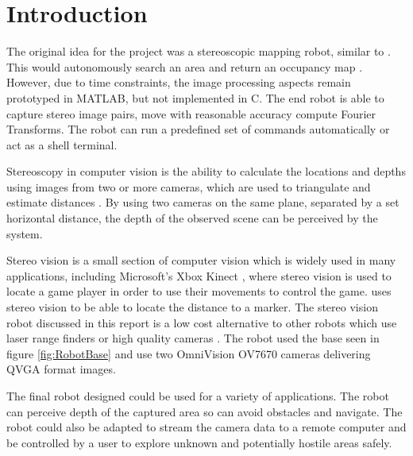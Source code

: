 \chapter{Introduction} \label{Chapter:Introduction}

%
%
%
%


The original idea for the project was a stereoscopic mapping robot, similar to \cite{Pirobot}. This would autonomously search an area and return an occupancy map \citep{thrun2003learning}. However, due to time constraints, the image processing aspects remain prototyped in MATLAB, but not implemented in C. The end robot is able to capture stereo image pairs, move with reasonable accuracy compute Fourier Transforms. The robot can run a predefined set of commands automatically or act as a shell terminal.

Stereoscopy in computer vision is the ability to calculate the locations and depths using images from two or more cameras, which are used to triangulate and estimate distances \citep{Saxena:DepthEstimation}. By using two cameras on the same plane, separated by a set horizontal distance, the depth of the observed scene can be perceived by the system.

Stereo vision is a small section of computer vision which is widely used in many applications, including Microsoft's Xbox Kinect \citep{Microsoft:Kinect}, where stereo vision is used to locate a game player in order to use their movements to control the game. \cite{Mrovlje:Distance_Stereoscopic} uses stereo vision to be able to locate the distance to a marker. 
The stereo vision robot discussed in this report is a low cost alternative to other robots which use laser range finders or high quality cameras \citep{Se:MappingRobot}. The robot used the base seen in figure \ref{fig:RobotBase} and use two OmniVision OV7670 cameras delivering QVGA format images.

The final robot designed could be used for a variety of applications. The robot can perceive depth of the captured area so can avoid obstacles and navigate. The robot could also be adapted to stream the camera data to a remote computer and be controlled by a user to explore unknown and potentially hostile areas safely. 

